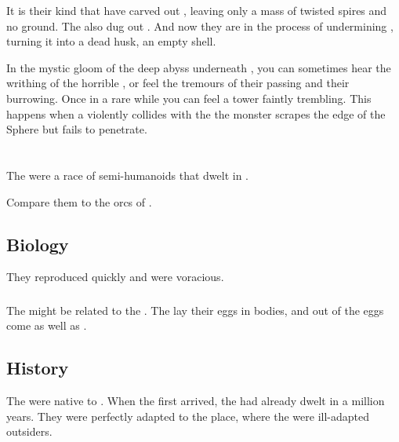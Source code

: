 It is their kind that have carved out \Erebos, leaving only a mass of twisted spires and no ground. 
The also dug out \Nyx. And now they are in the process of undermining \Miith{}, turning it into a dead husk, an empty shell. 

In the mystic gloom of the deep abyss underneath \Nyx, you can sometimes hear the writhing of the horrible , or feel the tremours of their passing and their burrowing.
Once in a rare while you can feel a tower faintly trembling. 
This happens when a \noggyal{} violently collides with the \CrystalSphere{}\dash the monster scrapes the edge of the Sphere but fails to penetrate. 















\section{\Morkin}
\index{\morkin}
The \morkins were a race of semi-humanoids that dwelt in \Nyx.

Compare them to the orcs of \cite{RPG:Warhammer}. 









\subsection{Biology}
They reproduced quickly and were voracious. 





\subsubsection{\Ozurians}
The \morkins might be related to the \ozurians. 
The \ozurians lay their eggs in \morkin bodies, and out of the eggs come \ozurians as well as \morkins. 









\subsection{History}
The \morkins were native to \Nyx.
When the first \resphain arrived, the \morkins had already dwelt in \Nyx a million years.
They were perfectly adapted to the place, where the \resphain were ill-adapted outsiders. 









